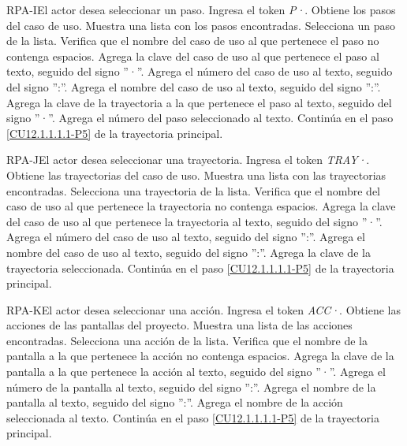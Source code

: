 	\begin{UCtrayectoriaA}{RPA-I}{El actor desea seleccionar un paso.}
		\UCpaso[\UCactor] Ingresa el token {\em P·}. 
		\UCpaso[\UCsist] Obtiene los pasos del caso de uso.
		\UCpaso[\UCsist] Muestra una lista con los pasos encontradas.
		\UCpaso[\UCactor] Selecciona un paso de la lista.
		\UCpaso[\UCsist] Verifica que el nombre del caso de uso al que pertenece el paso no contenga espacios. 
		\UCpaso[\UCsist] Agrega la clave del caso de uso al que pertenece el paso al texto, seguido del signo ''·''.
		\UCpaso[\UCsist] Agrega el número del caso de uso al texto, seguido del signo '':''.
		\UCpaso[\UCsist] Agrega el nombre del caso de uso al texto, seguido del signo '':''.
		\UCpaso[\UCsist] Agrega la clave de la trayectoria a la que pertenece el paso al texto, seguido del signo ''·''.
		\UCpaso[\UCsist] Agrega el número del paso seleccionado al texto.
		\UCpaso Continúa en el paso \ref{CU12.1.1.1.1-P5} de la trayectoria principal.
	\end{UCtrayectoriaA}

	\begin{UCtrayectoriaA}{RPA-J}{El actor desea seleccionar una trayectoria.}
		\UCpaso[\UCactor] Ingresa el token {\em TRAY·}. 
		\UCpaso[\UCsist] Obtiene las trayectorias del caso de uso.
		\UCpaso[\UCsist] Muestra una lista con las trayectorias encontradas.
		\UCpaso[\UCactor] Selecciona una trayectoria de la lista.
		\UCpaso[\UCsist] Verifica que el nombre del caso de uso al que pertenece la trayectoria no contenga espacios. 
		\UCpaso[\UCsist] Agrega la clave del caso de uso al que pertenece la trayectoria al texto, seguido del signo ''·''.
		\UCpaso[\UCsist] Agrega el número del caso de uso al texto, seguido del signo '':''.
		\UCpaso[\UCsist] Agrega el nombre del caso de uso al texto, seguido del signo '':''.
		\UCpaso[\UCsist] Agrega la clave de la trayectoria seleccionada.
		\UCpaso Continúa en el paso \ref{CU12.1.1.1.1-P5} de la trayectoria principal.
	\end{UCtrayectoriaA}

	\begin{UCtrayectoriaA}{RPA-K}{El actor desea seleccionar una acción.}
		\UCpaso[\UCactor] Ingresa el token {\em ACC·}. 
		\UCpaso[\UCsist] Obtiene las acciones de las pantallas del proyecto.
		\UCpaso[\UCsist] Muestra una lista de las acciones encontradas.
		\UCpaso[\UCactor] Selecciona una acción de la lista.
		\UCpaso[\UCsist] Verifica que el nombre de la pantalla a la que pertenece la acción no contenga espacios. 
		\UCpaso[\UCsist] Agrega la clave de la pantalla a la que pertenece la acción al texto, seguido del signo ''·''.
		\UCpaso[\UCsist] Agrega el número de la pantalla al texto, seguido del signo '':''.
		\UCpaso[\UCsist] Agrega el nombre de la pantalla al texto, seguido del signo '':''.
		\UCpaso[\UCsist] Agrega el nombre de la acción seleccionada al texto.
		\UCpaso Continúa en el paso \ref{CU12.1.1.1.1-P5} de la trayectoria principal.
	\end{UCtrayectoriaA}


